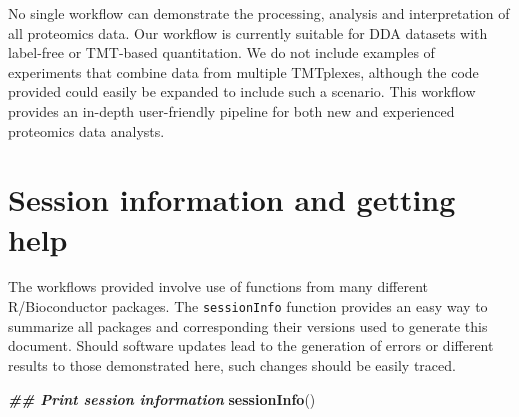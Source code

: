 \documentclass[9pt,a4paper,]{extarticle}
\newenvironment{Shaded}{\begin{snugshade}}{\end{snugshade}}
\newcommand{\DocumentationTok}[1]{\textcolor[rgb]{0.56,0.35,0.01}{\textbf{\textit{#1}}}}
\newcommand{\FunctionTok}[1]{\textcolor[rgb]{0.13,0.29,0.53}{\textbf{#1}}}
\newcommand{\NormalTok}[1]{#1}
\begin{document}
No single workflow can demonstrate the processing, analysis and interpretation
of all proteomics data. Our workflow is currently suitable for DDA datasets with
label-free or TMT-based quantitation. We do not include examples of experiments
that combine data from multiple TMTplexes, although the code provided could
easily be expanded to include such a scenario. This workflow provides an in-depth
user-friendly pipeline for both new and experienced proteomics data analysts.

\section{Session information and getting help}\label{session-information-and-getting-help}

The workflows provided involve use of functions from many different
R/Bioconductor packages. The \texttt{sessionInfo} function provides an easy way to
summarize all packages and corresponding their versions used to generate this
document. Should software updates lead to the generation of errors or different
results to those demonstrated here, such changes should be easily traced.

\begin{Shaded}
\begin{Highlighting}[]
\DocumentationTok{\#\# Print session information}
\FunctionTok{sessionInfo}\NormalTok{()}
\end{Highlighting}
\end{Shaded}
\end{document}
